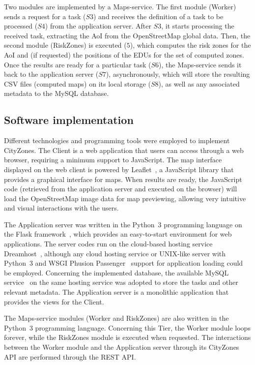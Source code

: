 \begin{refsection}
Two modules are implemented by a Maps-service. The first module (Worker) sends a request for a task ($S3$) and receives the definition of a task to be processed ($S4$) from the application server. After $S3$, it starts processing the received task, extracting the AoI from the OpenStreetMap global data. Then, the second module (RiskZones) is executed ($5$), which computes the risk zones for the AoI and (if requested) the positions of the EDUs for the set of computed zones. Once the results are ready for a particular task ($S6$), the Maps-service sends it back to the application server ($S7$), asynchronously, which will store the resulting CSV files (computed maps) on its local storage ($S8$), as well as any associated metadata to the MySQL database.

\subsection{Software implementation}

Different technologies and programming tools were employed to implement CityZones. The Client is a web application that users can access through a web browser, requiring a minimum support to JavaScript. The map interface displayed on the web client is powered by Leaflet~\cite{leaflet}, a JavaScript library that provides a graphical interface for maps. When results are ready, the JavaScript code (retrieved from the application server and executed on the browser) will load the OpenStreetMap image data for map previewing, allowing very intuitive and visual interactions with the users.

The Application server was written in the Python~3 programming language on the Flask framework~\cite{flask}, which provides an easy-to-start environment for web applications. The server codes run on the cloud-based hosting service Dreamhost~\cite{dreamhost}, although any cloud hosting service or UNIX-like server with Python~3 and WSGI Phusion Passenger~\cite{phusion} support for application loading could be employed. Concerning the implemented database, the available MySQL service~\cite{mysql} on the same hosting service was adopted to store the tasks and other relevant metadata. The Application server is a monolithic application that provides the views for the Client.

The Maps-service modules (Worker and RiskZones) are also written in the Python~3 programming language. Concerning this Tier, the Worker module loops forever, while the RiskZones module is executed when requested. The interactions between the Worker module and the Application server through its CityZones API are performed through the REST API.


\end{refsection}
